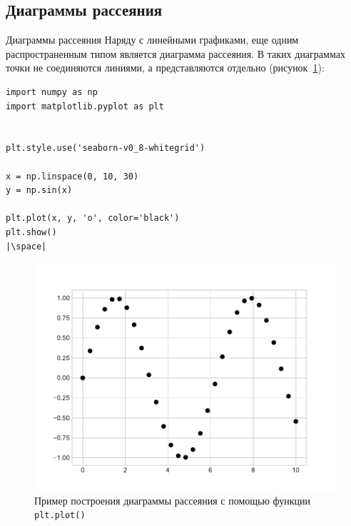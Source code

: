 \documentclass[aspectratio=169, mathserif]{beamer}	%
\begin{document}
\subsection{Диаграммы рассеяния}
\begin{frame}[fragile, label=m]{Диаграммы рассеяния}
\scriptsize
Наряду с линейными графиками, еще одним распространенным типом является диаграмма рассеяния. В таких диаграммах точки не соединяются линиями, а представляются отдельно (рисунок~\ref{fig:fig_13}):
\vfill
\begin{minipage}{.4\textwidth}
\begin{verbatim}
import numpy as np
import matplotlib.pyplot as plt


plt.style.use('seaborn-v0_8-whitegrid')

x = np.linspace(0, 10, 30)
y = np.sin(x)

plt.plot(x, y, 'o', color='black')
plt.show()
|\space|
\end{verbatim}
\end{minipage}
\begin{minipage}{.59\textwidth}
\begin{figure}[h!]
	\centering
	\includegraphics[width=.85\linewidth]{./pics/Figure_13}
	\caption{Пример построения диаграммы рассеяния с помощью функции \texttt{plt.plot()}}
	\label{fig:fig_13}
\end{figure}
\end{minipage}
\vfill
\end{frame}
\end{document}
